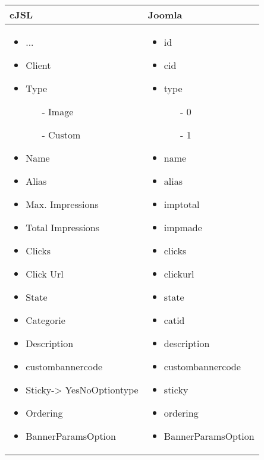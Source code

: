 \begin{minipage}{0.7\textwidth}
\begin{tabular}{|p{} | p{}|}
\hline
\textbf{cJSL} & \textbf{Joomla} \\ 
\hline
\begin{itemize}
\item  ...
\item  Client
\item  Type
	\begin{enumerate}
      \item[-] Image
	  \item[-] Custom
	\end{enumerate}
\item  Name
\item  Alias
\item  Max. Impressions
\item  Total Impressions
\item  Clicks
\item  Click Url
\item  State
\item  Categorie
\item  Description
\item  custombannercode
\item  Sticky-> YesNoOptiontype
\item  Ordering
\item  BannerParamsOption
\end{itemize}
 & 
\begin{itemize}
\item  id
\item  cid
\item  type
	\begin{enumerate}
      \item[-] 0
	  \item[-] 1
	\end{enumerate}
\item  name
\item  alias
\item  imptotal
\item  impmade
\item  clicks
\item  clickurl
\item  state
\item  catid
\item  description
\item  custombannercode
\item  sticky
\item  ordering
\item  BannerParamsOption

\end{itemize}
\\
\hline
\end{tabular}
\end{minipage}

